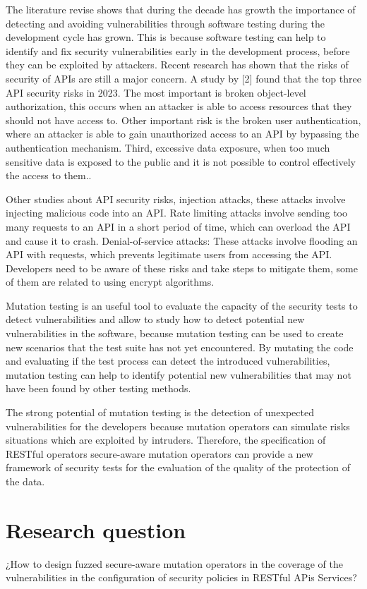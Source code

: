 The literature revise shows that during the decade has growth the importance of detecting and avoiding vulnerabilities through software testing\cite{8564344} during the development cycle has grown.  This is because software testing can help to identify and fix security vulnerabilities early in the development process, before they can be exploited by attackers. Recent research has shown that the risks of security of APIs are still a major concern. A study by [2] found that the top three API security risks in 2023. The most important is broken object-level authorization, this occurs when an attacker is able to access resources that they should not have access to. Other important risk is the broken user authentication, where an attacker is able to gain unauthorized access to an API by bypassing the authentication mechanism. Third, excessive data exposure, when too much sensitive data is exposed to the public and it is not possible to control effectively the access to them..

Other studies about API security risks\cite{zenodo}, injection attacks, these attacks involve injecting malicious code into an API. Rate limiting attacks involve sending too many requests to an API in a short period of time, which can overload the API and cause it to crash. Denial-of-service attacks: These attacks involve flooding an API with requests, which prevents legitimate users from accessing the API. Developers need to be aware of these risks and take steps to mitigate them, some of them are related to using encrypt algorithms.

Mutation testing is an useful tool to evaluate the capacity of the security tests to detect vulnerabilities and allow to study how to detect potential new vulnerabilities in the software, because mutation testing can be used to create new scenarios that the test suite has not yet encountered. By mutating the code and evaluating if the test process can detect the introduced vulnerabilities, mutation testing can help to identify potential new vulnerabilities that may not have been found by other testing methods.

The strong potential of mutation testing is the detection of unexpected vulnerabilities for the developers because mutation operators can simulate risks situations which are exploited by intruders. Therefore, the specification of RESTful operators secure-aware mutation operators can provide a new framework of security tests for the evaluation of the quality of the protection of the data.

\section{Research question}

¿How to design fuzzed secure-aware mutation operators in the coverage of the vulnerabilities in the configuration of security policies in RESTful APis Services?
